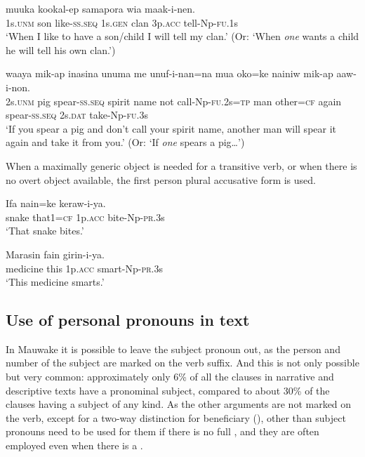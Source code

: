 \ea%
\label{ex:3:x621}
\gll {} muuka kookal-ep  samapora wia maak-i-nen.\\
1s.\textsc{unm} son like-\textsc{ss}.\textsc{seq} 1s.\textsc{gen} clan 3p.\textsc{acc} tell-Np-\textsc{fu}.1s\\
\glt`When I like to have a son/child I will tell my clan.' (Or: `When \textit{one} wants a child he will tell his own clan.')
\z

\ea%
\label{ex:3:x622}
\gll {} waaya mik-ap inasina unuma me unuf-i-nan=na mua oko=ke nainiw mik-ap  aaw-i-non.\\
2s.\textsc{unm} pig spear-\textsc{ss}.\textsc{seq} spirit name not call-Np-\textsc{fu}.2s=\textsc{tp} man other=\textsc{cf} again spear-\textsc{ss}.\textsc{seq} 2s.\textsc{dat} take-Np-\textsc{fu}.3s\\
\glt`If you spear a pig and don't call your spirit name, another man will spear it again and take it from you.' (Or: `If \textit{one} spears a pig{\dots}')
\z

When a maximally generic object is needed for a transitive verb, or when there is no overt object available, the first person plural accusative form is used. 

\ea%
\label{ex:3:x623}
\gll Ifa nain=ke  keraw-i-ya. \\
snake that1=\textsc{cf} 1p.\textsc{acc} bite-Np-\textsc{pr}.3s\\
\glt`That snake bites.'
\z

\ea%
\label{ex:3:x624}
\gll Marasin fain  girin-i-ya. \\
medicine this 1p.\textsc{acc} smart-Np-\textsc{pr}.3s\\
\glt`This medicine smarts.'
\z

\subsection{Use of personal pronouns in text}\label{sec:3.5.11}
{}
In Mauwake it is possible to leave the subject pronoun out, as the person and number of the subject are marked on the verb suffix. And this is not only possible but very common: approximately only 6\% of all the clauses in narrative and descriptive texts have a pronominal subject, compared to about 30\% of the clauses having a subject  of any kind. As the other arguments are not marked on the verb, except for a two-way distinction for beneficiary (), other than subject pronouns need to be used for them if there is no full , and they are often employed even when there is a .

